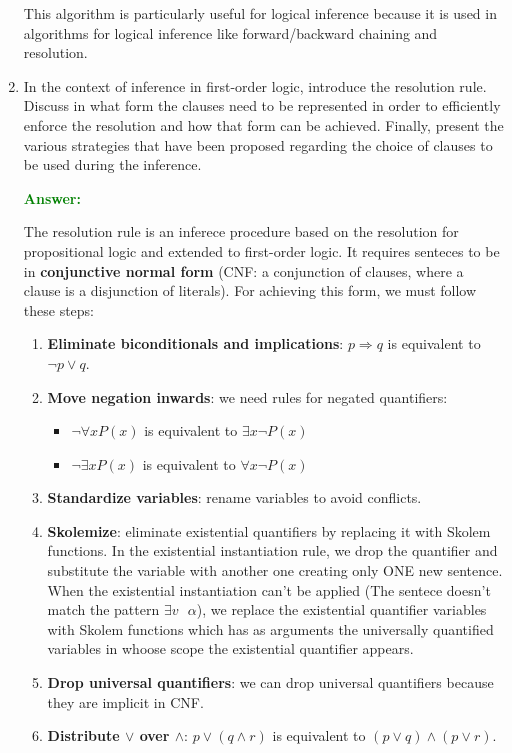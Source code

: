 \documentclass[12pt]{article}
\begin{document}
\begin{enumerate}[label=\textbf{FOL.\arabic*}]
    This algorithm is particularly useful for logical inference because it is used in algorithms for logical inference like forward/backward chaining and resolution.


    \item In the context of inference in first-order logic, introduce the resolution rule.
    Discuss in what form the clauses need to be represented in order to efficiently enforce the resolution and how that form can be achieved.
    Finally, present the various strategies that have been proposed regarding the choice of clauses to be used during the inference.

    \textcolor{green}{\textbf{Answer:}}

    The resolution rule is an inferece procedure based on the resolution for propositional logic and extended to first-order logic.
    It requires senteces to  be in \textbf{conjunctive normal form} (CNF\@: a conjunction of clauses, where a clause is a disjunction of literals).
    For achieving this form, we must follow these steps:
    \begin{enumerate}
        \item \textbf{Eliminate biconditionals and implications}: $p\Rightarrow q$ is equivalent to $\lnot p\lor q$.
        \item \textbf{Move negation inwards}: we need rules for negated quantifiers:
        \begin{itemize}
            \item $\lnot\forall x P(x)$ is equivalent to $\exists x \lnot P(x)$
            \item $\lnot\exists x P(x)$ is equivalent to $\forall x \lnot P(x)$
        \end{itemize}
        \item \textbf{Standardize variables}: rename variables to avoid conflicts.
        \item \textbf{Skolemize}: eliminate existential quantifiers by replacing it with Skolem functions.
        In the existential instantiation rule, we drop the quantifier and substitute the variable with another one creating only ONE new sentence.
        When the existential instantiation can't be applied (The sentece doesn't match the pattern $\exists v\text{  }\alpha$), we replace 
        the existential quantifier variables with Skolem functions which has as arguments the universally quantified variables in whoose scope the existential quantifier appears.

        \item \textbf{Drop universal quantifiers}: we can drop universal quantifiers because they are implicit in CNF\@.
        \item \textbf{Distribute $\lor$ over $\land$}: $p\lor(q\land r)$ is equivalent to $(p\lor q)\land(p\lor r)$.
    \end{enumerate}


\end{enumerate}
\end{document}
